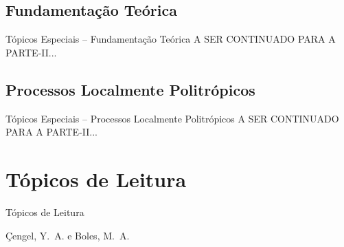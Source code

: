 \subsection{Fundamentação Teórica}

    \begin{frame}{Tópicos Especiais -- Fundamentação Teórica}\vspace*{-2em}
        A SER CONTINUADO PARA A PARTE-II...
    \end{frame}

\subsection{Processos Localmente Politrópicos}

    \begin{frame}{Tópicos Especiais -- Processos Localmente Politrópicos}\vspace*{-2em}
        A SER CONTINUADO PARA A PARTE-II...
    \end{frame}

\section{Tópicos de Leitura}

    \begin{frame}[allowframebreaks]{Tópicos de Leitura}
        \begin{thebibliography}{Çengel, Y.~A., 2013}
                Çengel, Y.~A. e Boles, M.~A.
        \end{thebibliography}
    \end{frame}




